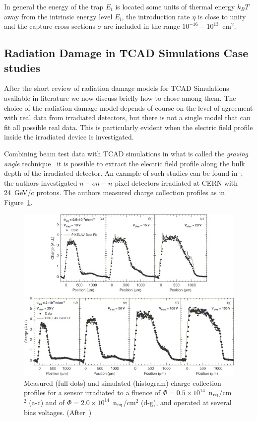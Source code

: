 In general the energy of the trap $E_t$ is located some units of thermal energy $k_B T$ away from the 
intrinsic energy level $E_i$, the introduction rate $\eta$ is close to unity and the 
capture cross sections $\sigma$ are included in the range $10^{-16}-10^{13}$~cm$^2$.

\subsection{Radiation Damage in TCAD Simulations Case studies}

After the short review of radiation damage models for TCAD Simulations available in literature 
we now discuss briefly how to chose among them.
The choice of the radiation damage model depends of course 
on the level of agreement with real data from irradiated detectors, but there is not a single model 
that can fit all possible real data. This is particularly evident when the electric field profile inside 
the irradiated device is investigated. 

Combining beam test data with TCAD simulations in what is called the {\it grazing angle} 
technique~\cite{Henrich:687041,Lari:2001qqa}  
it is possible to extract the electric field profile along the bulk depth of the irradiated detector.
An example of such studies can be found in~\cite{Chiochia2005,CHIOCHIA2006}; the 
authors investigated $n-on-n$ pixel detectors irradiated at CERN with  24~GeV/c protons. 
The authors measured charge collection profiles as in Figure~\ref{fig:chiochia2006_profiles}. 

\begin{figure}[!htpb]
\centering
\includegraphics[width=1.00\textwidth]{chiochia2006_profiles.jpg}
\caption{\label{fig:chiochia2006_profiles}Measured (full dots) and simulated (histogram) charge collection profiles for a sensor irradiated to a fluence of $\Phi = 0.5\times10^{14}$~n$_{\rm eq}$/cm$^2$  (a-c) and of $\Phi = 2.0\times10^{14}$~n$_{\rm eq}$/cm$^2$  (d-g), and operated at several bias voltages. (After~\cite{CHIOCHIA2006})}
\end{figure}

